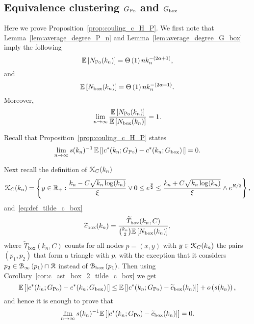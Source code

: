 \subsection{Equivalence clustering \texorpdfstring{$G_{{\mathrm{Po}}}$}{G Po} and \texorpdfstring{$G_{\mathrm{box}}$}{G box}}\label{ssec:coupling_HP_ast_P}


Here we prove Proposition~\ref{prop:couling_c_H_P}. We first note that Lemma~\ref{lem:average_degree_P_n} and Lemma~\ref{lem:average_degree_G_box} imply the following
\begin{equation} \label{eq:n_k_Hyp}
	\mathbb{E}\left[N_{{\mathrm{Po}}}(k_n)\right] = \Theta\left(1\right) n k_n^{-(2\alpha + 1)},
\end{equation}
and
\begin{equation} \label{eq:n_k_Po}
	\mathbb{E}\left[N_{\mathrm{box}}(k_n)\right] = \Theta\left(1\right) n k_n^{-(2\alpha + 1)}.
\end{equation}
Moreover,
\begin{equation}\label{eq:equivalence_N_HP_P}
	\lim_{n \to \infty} \frac{\mathbb{E}\left[N_{{\mathrm{Po}}}(k_n)\right]}{\mathbb{E}\left[N_{\mathrm{box}}(k_n)\right]} = 1.
\end{equation}

Recall that Proposition~\ref{prop:couling_c_H_P} states
\[
	\lim_{n \to \infty} s(k_n)^{-1} \, \mathbb{E}\left[\left|c^\ast(k_n; G_{{\mathrm{Po}}}) - c^\ast(k_n;G_{\mathrm{box}})\right|\right] = 0.
\]

Next recall the definition of ${\mathcal K}_{C}(k_n)$
\[
	{\mathcal K}_C(k_n) = \left\{y \in {\ensuremath{\mathbb R}}_+ : \frac{k_n - C \sqrt{k_n \log(k_n)}}{\xi} \vee 0 \le e^{\frac{y}{2}}
	\le \frac{k_n + C \sqrt{k_n \log(k_n)}}{\xi} \wedge e^{R/2} \right\},
\]
and~\eqref{eq:def_tilde_c_box}
\[
	\widetilde{c}_{\text{box}}(k_n) = \frac{\widetilde{T}_{\text{box}}(k_n,C)}{\binom{k_n}{2}\mathbb{E}\left[N_{\text{box}}(k_n)\right]},
\]
where $\widetilde{T}_{\text{box}}(k_n,C)$ counts for all nodes $p = (x,y)$ with $y \in {\mathcal K}_{C}(k_n)$ the pairs $(p_1,p_2)$ that form a triangle with $p$, with the exception that it considers $p_2 \in {\mathcal B}_{\infty}\left(p_1\right) \cap {\mathcal R}$ instead of ${\mathcal B}_{\text{box}}\left(p_1\right)$. Then using Corollary~\ref{cor:c_ast_box_2_tilde_c_box} we get
\[
	\mathbb{E}\left[\left|c^\ast(k_n; G_{{\mathrm{Po}}}) - c^\ast(k_n;G_{\mathrm{box}})\right|\right]
	\le \mathbb{E}\left[\left|c^\ast(k_n; G_{{\mathrm{Po}}}) - \widetilde{c}_{\text{box}}(k_n)\right|\right] 
	+ o\left(s(k_n)\right),
\]
and hence it is enough to prove that
\[
	\lim_{n \to \infty} s(k_n)^{-1}\mathbb{E}\left[\left|c^\ast(k_n; G_{{\mathrm{Po}}}) - \widetilde{c}_{\text{box}}(k_n)\right|\right] = 0.
\]



